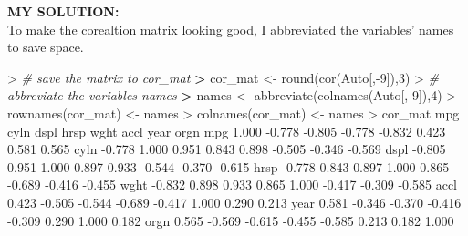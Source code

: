 \documentclass[
]{article}
\newenvironment{Shaded}{\begin{snugshade}}{\end{snugshade}}
\newcommand{\CommentTok}[1]{\textcolor[rgb]{0.56,0.35,0.01}{\textit{#1}}}
\newcommand{\DecValTok}[1]{\textcolor[rgb]{0.00,0.00,0.81}{#1}}
\newcommand{\ErrorTok}[1]{\textcolor[rgb]{0.64,0.00,0.00}{\textbf{#1}}}
\newcommand{\FloatTok}[1]{\textcolor[rgb]{0.00,0.00,0.81}{#1}}
\newcommand{\FunctionTok}[1]{\textcolor[rgb]{0.00,0.00,0.00}{#1}}
\newcommand{\NormalTok}[1]{#1}
\newcommand{\OtherTok}[1]{\textcolor[rgb]{0.56,0.35,0.01}{#1}}
\newcommand{\SpecialCharTok}[1]{\textcolor[rgb]{0.00,0.00,0.00}{#1}}
\begin{document}
\textbf{MY SOLUTION:}\\
To make the corealtion matrix looking good, I abbreviated the variables'
names to save space.

\begin{Shaded}
\begin{Highlighting}[]
\SpecialCharTok{\textgreater{}} \CommentTok{\# save the matrix to cor\_mat}
\ErrorTok{\textgreater{}}\NormalTok{ cor\_mat }\OtherTok{\textless{}{-}} \FunctionTok{round}\NormalTok{(}\FunctionTok{cor}\NormalTok{(Auto[,}\SpecialCharTok{{-}}\DecValTok{9}\NormalTok{]),}\DecValTok{3}\NormalTok{)}
\SpecialCharTok{\textgreater{}} \CommentTok{\# abbreviate the variables\textquotesingle{} names}
\ErrorTok{\textgreater{}}\NormalTok{ names }\OtherTok{\textless{}{-}} \FunctionTok{abbreviate}\NormalTok{(}\FunctionTok{colnames}\NormalTok{(Auto[,}\SpecialCharTok{{-}}\DecValTok{9}\NormalTok{]),}\DecValTok{4}\NormalTok{)}
\SpecialCharTok{\textgreater{}} \FunctionTok{rownames}\NormalTok{(cor\_mat) }\OtherTok{\textless{}{-}}\NormalTok{ names}
\SpecialCharTok{\textgreater{}} \FunctionTok{colnames}\NormalTok{(cor\_mat) }\OtherTok{\textless{}{-}}\NormalTok{ names}
\SpecialCharTok{\textgreater{}}\NormalTok{ cor\_mat}
\NormalTok{        mpg   cyln   dspl   hrsp   wght   accl   year   orgn}
\NormalTok{mpg   }\FloatTok{1.000} \SpecialCharTok{{-}}\FloatTok{0.778} \SpecialCharTok{{-}}\FloatTok{0.805} \SpecialCharTok{{-}}\FloatTok{0.778} \SpecialCharTok{{-}}\FloatTok{0.832}  \FloatTok{0.423}  \FloatTok{0.581}  \FloatTok{0.565}
\NormalTok{cyln }\SpecialCharTok{{-}}\FloatTok{0.778}  \FloatTok{1.000}  \FloatTok{0.951}  \FloatTok{0.843}  \FloatTok{0.898} \SpecialCharTok{{-}}\FloatTok{0.505} \SpecialCharTok{{-}}\FloatTok{0.346} \SpecialCharTok{{-}}\FloatTok{0.569}
\NormalTok{dspl }\SpecialCharTok{{-}}\FloatTok{0.805}  \FloatTok{0.951}  \FloatTok{1.000}  \FloatTok{0.897}  \FloatTok{0.933} \SpecialCharTok{{-}}\FloatTok{0.544} \SpecialCharTok{{-}}\FloatTok{0.370} \SpecialCharTok{{-}}\FloatTok{0.615}
\NormalTok{hrsp }\SpecialCharTok{{-}}\FloatTok{0.778}  \FloatTok{0.843}  \FloatTok{0.897}  \FloatTok{1.000}  \FloatTok{0.865} \SpecialCharTok{{-}}\FloatTok{0.689} \SpecialCharTok{{-}}\FloatTok{0.416} \SpecialCharTok{{-}}\FloatTok{0.455}
\NormalTok{wght }\SpecialCharTok{{-}}\FloatTok{0.832}  \FloatTok{0.898}  \FloatTok{0.933}  \FloatTok{0.865}  \FloatTok{1.000} \SpecialCharTok{{-}}\FloatTok{0.417} \SpecialCharTok{{-}}\FloatTok{0.309} \SpecialCharTok{{-}}\FloatTok{0.585}
\NormalTok{accl  }\FloatTok{0.423} \SpecialCharTok{{-}}\FloatTok{0.505} \SpecialCharTok{{-}}\FloatTok{0.544} \SpecialCharTok{{-}}\FloatTok{0.689} \SpecialCharTok{{-}}\FloatTok{0.417}  \FloatTok{1.000}  \FloatTok{0.290}  \FloatTok{0.213}
\NormalTok{year  }\FloatTok{0.581} \SpecialCharTok{{-}}\FloatTok{0.346} \SpecialCharTok{{-}}\FloatTok{0.370} \SpecialCharTok{{-}}\FloatTok{0.416} \SpecialCharTok{{-}}\FloatTok{0.309}  \FloatTok{0.290}  \FloatTok{1.000}  \FloatTok{0.182}
\NormalTok{orgn  }\FloatTok{0.565} \SpecialCharTok{{-}}\FloatTok{0.569} \SpecialCharTok{{-}}\FloatTok{0.615} \SpecialCharTok{{-}}\FloatTok{0.455} \SpecialCharTok{{-}}\FloatTok{0.585}  \FloatTok{0.213}  \FloatTok{0.182}  \FloatTok{1.000}
\end{Highlighting}
\end{Shaded}
\end{document}
